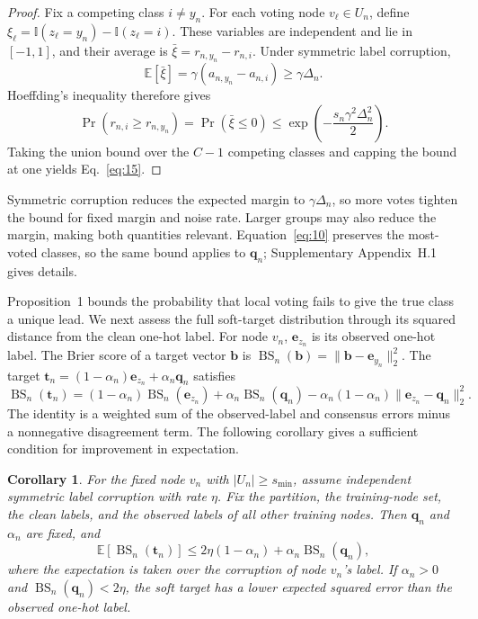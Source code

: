 \documentclass[times,review,10pt]{elsarticle}
\theoremstyle{definition}
\theoremstyle{plain}
\newtheorem{corollary}{Corollary}
\begin{document}
\begin{proof}
\renewcommand{\qedsymbol}{}
Fix a competing class \(i\ne y_n\). For each voting node \(v_\ell\in U_n\), define \(\xi_\ell=\mathbb I(z_\ell=y_n)-\mathbb I(z_\ell=i)\). These variables are independent and lie in \([-1,1]\), and their average is \(\bar\xi=r_{n,y_n}-r_{n,i}\). Under symmetric label corruption,
\[
\mathbb E[\bar\xi]=\gamma(a_{n,y_n}-a_{n,i})\geq\gamma\Delta_n.
\]
Hoeffding's inequality \cite{hoeffding1963} therefore gives
\[
\Pr\!\left(r_{n,i}\geq r_{n,y_n}\right)=\Pr(\bar\xi\leq0)
\leq\exp\!\left(-\frac{s_n\gamma^2\Delta_n^2}{2}\right).
\]
Taking the union bound over the \(C-1\) competing classes and capping the bound at one yields Eq.~\eqref{eq:15}.
\end{proof}

Symmetric corruption reduces the expected margin to \(\gamma\Delta_n\), so more votes tighten the bound for fixed margin and noise rate. Larger groups may also reduce the margin, making both quantities relevant. Equation~\eqref{eq:10} preserves the most-voted classes, so the same bound applies to \(\mathbf q_n\); Supplementary Appendix~H.1 gives details.

Proposition~1 bounds the probability that local voting fails to give the true class a unique lead. We next assess the full soft-target distribution through its squared distance from the clean one-hot label. For node \(v_n\), \(\mathbf e_{z_n}\) is its observed one-hot label. The Brier score of a target vector \(\mathbf b\) is \(\operatorname{BS}_n(\mathbf b)=\|\mathbf b-\mathbf e_{y_n}\|_2^2\). The target \(\mathbf t_n=(1-\alpha_n)\mathbf e_{z_n}+\alpha_n\mathbf q_n\) satisfies
\begin{equation}\label{eq:16}
\operatorname{BS}_n(\mathbf t_n)=(1-\alpha_n)\operatorname{BS}_n(\mathbf e_{z_n})+\alpha_n\operatorname{BS}_n(\mathbf q_n)-\alpha_n(1-\alpha_n)\|\mathbf e_{z_n}-\mathbf q_n\|_2^2.
\end{equation}
The identity is a weighted sum of the observed-label and consensus errors minus a nonnegative disagreement term. The following corollary gives a sufficient condition for improvement in expectation.

\begin{corollary}\label{cor:expected}
For the fixed node \(v_n\) with \(|U_n|\geq s_{\min}\), assume independent symmetric label corruption with rate \(\eta\). Fix the partition, the training-node set, the clean labels, and the observed labels of all other training nodes. Then \(\mathbf q_n\) and \(\alpha_n\) are fixed, and
\begin{equation}\label{eq:17}
\mathbb E[\operatorname{BS}_n(\mathbf t_n)]\leq2\eta(1-\alpha_n)+\alpha_n\operatorname{BS}_n(\mathbf q_n),
\end{equation}
where the expectation is taken over the corruption of node \(v_n\)'s label. If \(\alpha_n>0\) and \(\operatorname{BS}_n(\mathbf q_n)<2\eta\), the soft target has a lower expected squared error than the observed one-hot label.
\end{corollary}
\end{document}
